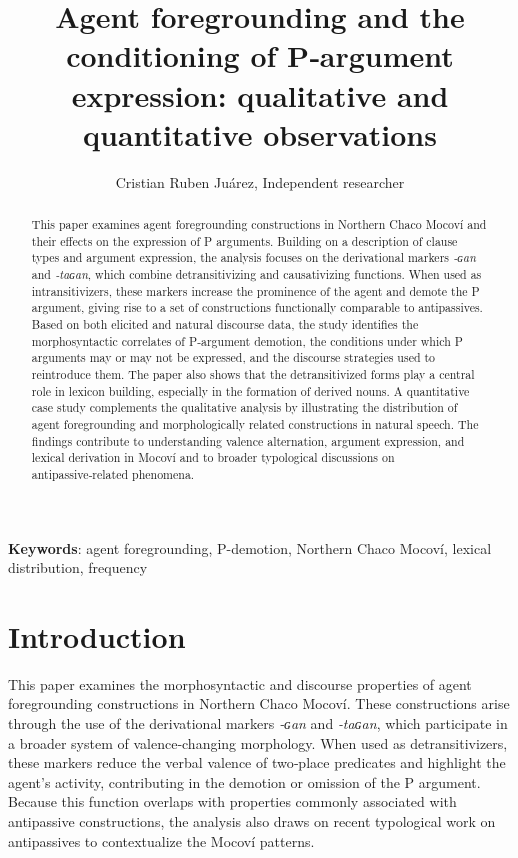\documentclass[12pt]{article}
\title{\textbf{Agent foregrounding and the conditioning of P‑argument expression: qualitative and quantitative observations}}
\author{Cristian Ruben Juárez, Independent researcher}
\date{}
\begin{document}
\maketitle

\begin{abstract}
This paper examines agent foregrounding constructions in Northern Chaco Mocoví and their effects on the expression of P arguments. Building on a description of clause types and argument expression, the analysis focuses on the derivational markers \textit{‑ɢan} and \textit{‑taɢan}, which combine detransitivizing and causativizing functions. When used as intransitivizers, these markers increase the prominence of the agent and demote the P argument, giving rise to a set of constructions functionally comparable to antipassives. Based on both elicited and natural discourse data, the study identifies the morphosyntactic correlates of P‑argument demotion, the conditions under which P arguments may or may not be expressed, and the discourse strategies used to reintroduce them. The paper also shows that the detransitivized forms play a central role in lexicon building, especially in the formation of derived nouns. A quantitative case study complements the qualitative analysis by illustrating the distribution of agent foregrounding  and morphologically related constructions in natural speech. The findings contribute to understanding valence alternation, argument expression, and lexical derivation in Mocoví and to broader typological discussions on antipassive‑related phenomena.
\end{abstract}

\noindent\textbf{Keywords}: agent foregrounding, P-demotion, Northern Chaco Mocoví, lexical distribution, frequency 

\section{Introduction}

This paper examines the morphosyntactic and discourse properties of agent foregrounding constructions in Northern Chaco Mocoví. These constructions arise through the use of the derivational markers \textit{‑ɢan} and \textit{‑taɢan}, which participate in a broader system of valence‑changing morphology. When used as detransitivizers, these markers reduce the verbal valence of two‑place predicates and highlight the agent’s activity, contributing in the demotion or omission of the P argument. Because this function overlaps with properties commonly associated with antipassive constructions, the analysis also draws on recent typological work on antipassives to contextualize the Mocoví patterns.
\end{document}
